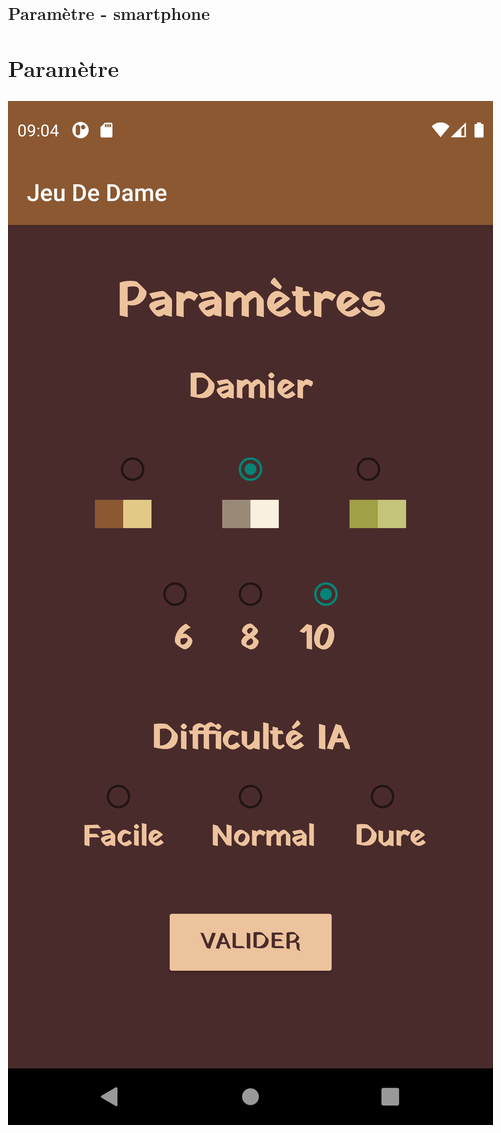 \documentclass{beamer}
\begin{document}
\begin{frame}
  \frametitle{Paramètre - smartphone}
  \subsection{Paramètre}
  \begin{center}
    \includegraphics[scale=0.05]{setting_francais.png}

\end{center}
\end{frame}
\end{document}
